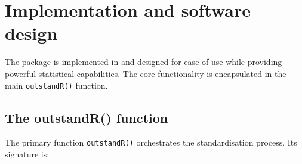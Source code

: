 \documentclass[article]{jss}
\begin{document}
%
\section{Implementation and software design}
\label{sec:implementation}

The  package is implemented in  and designed for ease of use while providing powerful statistical capabilities. The core functionality is encapsulated in the main \texttt{outstandR()} function.

\subsection{The outstandR() function} \label{ssec:outstandr_function}

The primary function \texttt{outstandR()} orchestrates the standardisation process. Its signature is:
\end{document}
